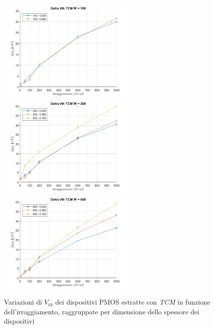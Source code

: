 \documentclass[12pt, letterpaper]{book}
\begin{document}
\begin{figure}[H]
  \centering
  \includegraphics[width=0.6\textwidth]{sovrapposizione-deltaVth-TCM-P100}
  \includegraphics[width=0.6\textwidth]{sovrapposizione-deltaVth-TCM-P200}
  \includegraphics[width=0.6\textwidth]{sovrapposizione-deltaVth-TCM-P600}
  \caption{Variazioni di $V_{th}$ dei dispositivi PMOS estratte con \emph{TCM} in funzione dell'irraggiamento, raggruppate per dimensione dello spessore dei dispositivi}
\end{figure}
\end{document}
